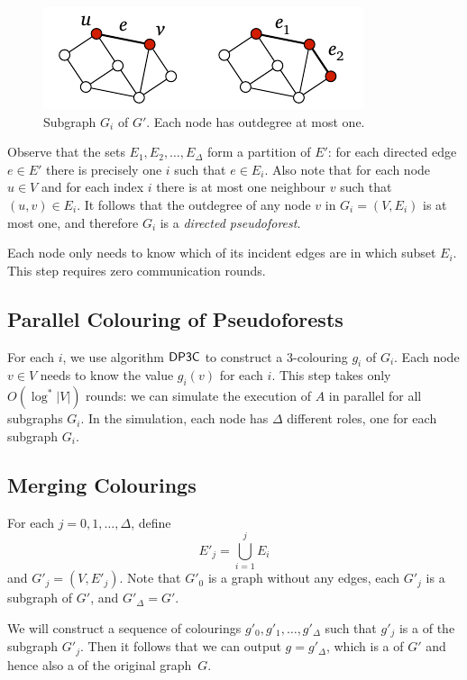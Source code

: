 \begin{figure}
    \centering
    \includegraphics[page=\PIdPickClass]{figs.pdf}
    \caption{Subgraph $G_i$ of $G'$. Each node has outdegree at most one.}\label{fig:id-pick-class}
\end{figure}
    
Observe that the sets $E_1, E_2, \dotsc, E_\Delta$ form a partition of $E'$: for each directed edge $e \in E'$ there is precisely one $i$ such that $e \in E_i$. Also note that for each node $u \in V$ and for each index $i$ there is at most one neighbour $v$ such that $(u,v) \in E_i$. It follows that the outdegree of any node $v$ in $G_i = (V,E_i)$ is at most one, and therefore $G_i$ is a \emph{directed pseudoforest}.
    
Each node only needs to know which of its incident edges are in which subset $E_i$. This step requires zero communication rounds.

\subsection{Parallel Colouring of Pseudoforests}

For each $i$, we use algorithm $\textup{\sffamily DP3C}$ to construct a $3$-colouring $g_i$ of $G_i$. Each node $v \in V$ needs to know the value $g_i(v)$ for each $i$. This step takes only $O(\log^* |V|)$ rounds: we can simulate the execution of $A$ in parallel for all subgraphs $G_i$. In the simulation, each node has $\Delta$ different roles, one for each subgraph $G_i$.

\subsection{Merging Colourings}

For each $j = 0, 1, \dotsc, \Delta$, define
\[
    E'_j = \bigcup_{i = 1}^j E_i
\]
and $G'_j = (V,E'_j)$. Note that $G'_0$ is a graph without any edges, each $G'_j$ is a subgraph of $G'$, and $G'_\Delta = G'$.

We will construct a sequence of colourings $g'_0, g'_1, \dotsc, g'_\Delta$ such that $g'_j$ is a \Dpocol{} of the subgraph $G'_j$. Then it follows that we can output $g = g'_\Delta$, which is a \Dpocol{} of $G'$ and hence also a \Dpocol{} of the original graph~$G$.

